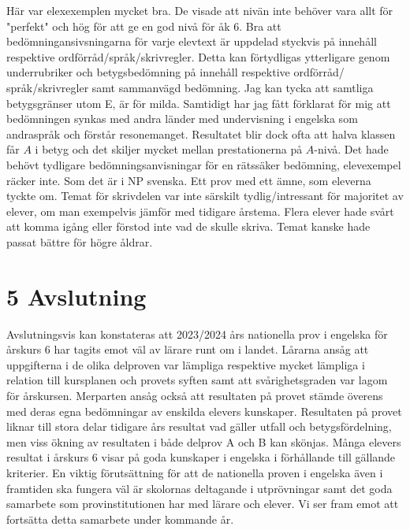 Här var elexexemplen mycket bra. De visade att nivän inte behöver vara allt för "perfekt" och hög för att ge en god nivå för åk 6.
Bra att bedömningansivsningarna för varje elevtext är uppdelad styckvis på innehåll respektive ordförråd/språk/skrivregler. Detta kan förtydligas ytterligare genom underrubriker och betygsbedömning på innehåll respektive ordförråd/ språk/skrivregler samt sammanvägd bedömning. Jag kan tycka att samtliga betygsgränser utom E, är för milda. Samtidigt har jag fått förklarat för mig att bedömningen synkas med andra länder med undervisning i engelska som andraspråk och förstår resonemanget. Resultatet blir dock ofta att halva klassen får \(A\) i betyg och det skiljer mycket mellan prestationerna på \(A\)-nivå.
Det hade behövt tydligare bedömningsanvisningar för en rätssäker bedömning, elevexempel räcker inte. Som det är i NP svenska.
Ett prov med ett ämne, som eleverna tyckte om.
Temat för skrivdelen var inte särskilt tydlig/intressant för majoritet av elever, om man exempelvis jämför med tidigare årstema. Flera elever hade svårt att komma igång eller förstod inte vad de skulle skriva. Temat kanske hade passat bättre för högre åldrar.
\section*{5 Avslutning}
Avslutningsvis kan konstateras att 2023/2024 års nationella prov i engelska för årskurs 6 har tagits emot väl av lärare runt om i landet. Lårarna ansåg att uppgifterna i de olika delproven var lämpliga respektive mycket lämpliga i relation till kursplanen och provets syften samt att svårighetsgraden var lagom för årskursen. Merparten ansåg också att resultaten på provet stämde överens med deras egna bedömningar av enskilda elevers kunskaper. Resultaten på provet liknar till stora delar tidigare års resultat vad gäller utfall och betygsfördelning, men viss ökning av resultaten i både delprov A och B kan skönjas. Många elevers resultat i årskurs 6 visar på goda kunskaper i engelska i förhållande till gällande kriterier.
En viktig förutsättning för att de nationella proven i engelska även i framtiden ska fungera väl är skolornas deltagande i utprövningar samt det goda samarbete som provinstitutionen har med lärare och elever. Vi ser fram emot att fortsätta detta samarbete under kommande år.